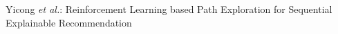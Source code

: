 \documentclass[10pt,journal,compsoc, twocolumn]{IEEEtran}
\begin{document}
% 
%



{Yicong \MakeLowercase{\textit{et al.}}: Reinforcement Learning based Path Exploration for Sequential Explainable Recommendation}




% 



\end{document}
